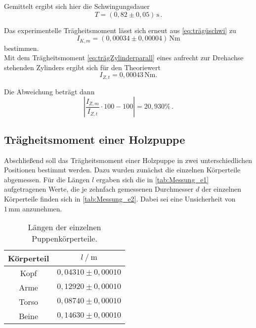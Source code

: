 Gemittelt ergibt sich hier die Schwingungsdauer
\begin{equation*}
  T = (0,82 \pm 0,05) \, \unit{\second} \,.
\end{equation*}

Das experimentelle Trägheitsmoment lässt sich erneut aus \eqref{eq:trägüschwi} zu
\begin{equation*}
  I_{K,m} = (0,00034 \pm 0,00004) \, \unit{\newton\meter}
\end{equation*} 
bestimmen. \\

Mit dem Trägheitsmoment \eqref{eq:trägZylinderparall}
eines aufrecht zur Drehachse stehenden Zylinders ergibt sich für den Theoriewert
\begin{equation*}
  I_{Z,t} = 0,00043 \,  \unit{\newton\meter}.
\end{equation*}

Die Abweichung beträgt dann
\begin{equation*}
  \left|\frac{I_{Z,m}}{I_{Z,t}} \cdot 100 - 100 \right| = 20,930 \% \,.
\end{equation*}

\newpage

\subsection{Trägheitsmoment einer Holzpuppe}
\label{subsec:e}

Abschließend soll das Trägheitsmoment einer Holzpuppe in zwei unterschiedlichen Positionen bestimmt werden. Dazu wurden zunächst die einzelnen Körperteile abgemessen.
Für die Längen $l$ ergaben sich die in \autoref{tab:Messung_e1} aufgetragenen Werte, die je zehnfach gemessenen Durchmesser $d$ der einzelnen Körperteile finden sich in \autoref{tab:Messung_e2}.
Dabei sei eine Unsicherheit von $1 \, \unit{\milli\meter}$ anzunehmen.

\begin{table}[H]
  \centering
  \begin{tabular}{S[table-format=2.0] S[table-format=2.2]}
      \toprule
      {Körperteil} & {$l \mathbin{/} \unit{\meter}$}\\
      \midrule
        {Kopf}  & {$0,04310 \pm 0,00010$} \\
        {Arme}  & {$0,12920 \pm 0,00010$} \\
        {Torso} & {$0,08740 \pm 0,00010$} \\
        {Beine} & {$0,14630 \pm 0,00010$} \\
      \bottomrule
  \end{tabular}
  \caption{Längen der einzelnen Puppenkörperteile.}
  \label{tab:Messung_e1}
\end{table}

